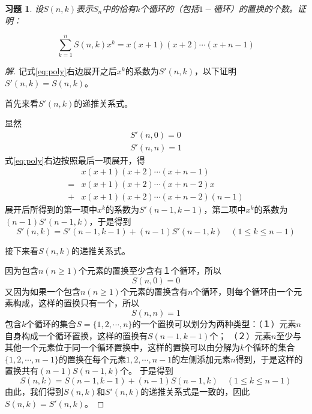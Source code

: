 \documentclass{article}
\begin{document}
\begin{CJK}{UTF8}{gbsn}
\newtheorem*{Ex}{习题}
  \begin{Ex}
      设$S(n,k)$表示$S_n$中的恰有$k$个循环的（包括$1-$循环）的置换的个数。证明：

      \begin{equation}
        \label{eq:poly}
      \sum_{k=1}^nS(n,k)x^k = x(x+1)(x+2)\cdots(x+n-1)        
      \end{equation}

  \end{Ex}

  \begin{proof}[解]
  记式\eqref{eq:poly}右边展开之后$x^k$的系数为$S'(n,k)$，以下证明
  $S'(n,k)=S(n,k)$。

  首先来看$S'(n,k)$的递推关系式。
  
  显然
  \begin{equation}
    \begin{split}
      S'(n,0) = 0\\
      S'(n,n) = 1
    \end{split}
  \end{equation}
  式\eqref{eq:poly}右边按照最后一项展开，得
  \begin{equation}
    \begin{split}
    &x(x+1)(x+2)\cdots(x+n-1)\\
    =&x(x+1)(x+2)\cdots(x+n-2)x\\
    +&x(x+1)(x+2)\cdots(x+n-2)(n-1)
    \end{split}
  \end{equation}
  展开后所得到的第一项中$x^k$的系数为$S'(n-1,k-1)$，第二项中$x^k$的系数为
  $(n-1)S'(n-1,k)$，于是得到
  \begin{equation}
    S'(n,k) = S'(n-1,k-1) + (n-1)S'(n-1,k) \quad (1 \leq k \leq n-1)
  \end{equation}

  接下来看$S(n,k)$的递推关系式。
  
  因为包含$n(n\geq 1)$个元素的置换至少含有１个循环，所以
  \begin{equation}
    S(n,0)=0
  \end{equation}
  又因为如果一个包含$n(n\geq 1)$个元素的置换含有$n$个循环，则每个循环由一个元素构成，这样的置换只有一个，所以
  \begin{equation}
    S(n,n)=1
  \end{equation}
  包含$k$个循环的集合$S=\{1,2,\cdots,n\}$的一个置换可以划分为两种类型：（１）元素$n$自身构成一个循环置换，这样的置换有$S(n-1,k-1)$个；
  （２）元素$n$至少与其他一个元素位于同一个循环置换中，这样的置换可以由分解为$k$个循环的集合$\{1,2,\cdots, n-1\}$的置换在每个元素$1,2,\cdots,n-1$的左侧添加元素$n$得到，于是这样的置换共有$(n-1)S(n-1,k)$个。
  于是得到
\begin{equation}
    S(n,k) = S(n-1,k-1) + (n-1)S(n-1,k) \quad (1 \leq k \leq n-1)
  \end{equation}
由此，我们得到$S(n,k)$和$S'(n,k)$的递推关系式是一致的，因此$S(n,k)=S'(n,k)$。  

 
\end{proof}
\end{CJK}
\end{document}
